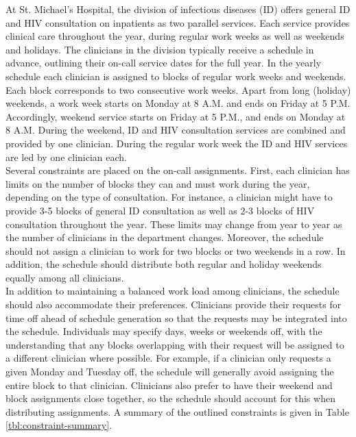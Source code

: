 At St. Michael's Hospital, the division of infectious diseases (ID) offers general ID and HIV consultation on inpatients as two parallel services. Each service provides clinical care throughout the year, during regular work weeks as well as weekends and holidays. The clinicians in the division typically receive a schedule in advance, outlining their on-call service dates for the full year. In the yearly schedule each clinician is assigned to blocks of regular work weeks and weekends. Each block corresponds to two consecutive work weeks. Apart from long (holiday) weekends, a work week starts on Monday at 8 A.M. and ends on Friday at 5 P.M. Accordingly, weekend service starts on Friday at 5 P.M., and ends on Monday at 8 A.M. During the weekend, ID and HIV consultation services are combined and provided by one clinician. During the regular work week the ID and HIV services are led by one clinician each. \\

Several constraints are placed on the on-call assignments. First, each clinician has limits on the number of blocks they can and must work during the year, depending on the type of consultation. For instance, a clinician might have to provide 3-5 blocks of general ID consultation as well as 2-3 blocks of HIV consultation throughout the year. These limits may change from year to year as the number of clinicians in the department changes. Moreover, the schedule should not assign a clinician to work for two blocks or two weekends in a row. In addition, the schedule should distribute both regular and holiday weekends equally among all clinicians. \\

In addition to maintaining a balanced work load among clinicians, the schedule should also accommodate their preferences. Clinicians provide their requests for time off ahead of schedule generation so that the requests may be integrated into the schedule. Individuals may specify days, weeks or weekends off, with the understanding that any blocks overlapping with their request will be assigned to a different clinician where possible. For example, if a clinician only requests a given Monday and Tuesday off, the schedule will generally avoid assigning the entire block to that clinician. Clinicians also prefer to have their weekend and block assignments close together, so the schedule should account for this when distributing assignments. A summary of the outlined constraints is given in Table \ref{tbl:constraint-summary}.

